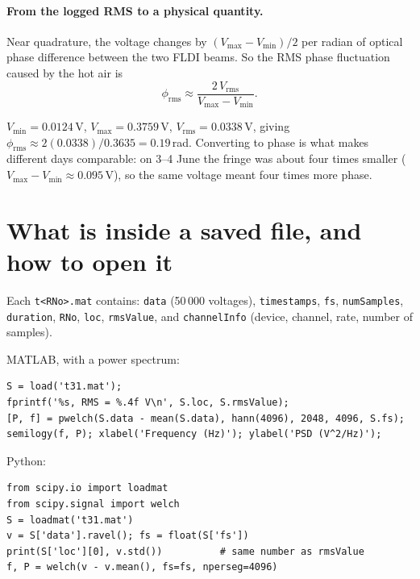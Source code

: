 \documentclass[11pt,a4paper]{article}
\newcommand{\code}[1]{\texttt{#1}}
\begin{document}
\paragraph{From the logged RMS to a physical quantity.} Near quadrature, the voltage changes by
$(V_{\max}-V_{\min})/2$ per radian of optical phase difference between the two FLDI beams. So the
RMS phase fluctuation caused by the hot air is
\[
\phi_{\mathrm{rms}} \approx \frac{2\,V_{\mathrm{rms}}}{V_{\max}-V_{\min}}.
\]
\begin{keypoint}
$V_{\min}=0.0124$\,V, $V_{\max}=0.3759$\,V, $V_{\mathrm{rms}}=0.0338$\,V, giving
$\phi_{\mathrm{rms}} \approx 2(0.0338)/0.3635 = 0.19$\,rad. Converting to phase is what makes
different days comparable: on 3--4 June the fringe was about four times smaller
($V_{\max}-V_{\min}\approx0.095$\,V), so the same voltage meant four times more phase.
\end{keypoint}

\section{What is inside a saved file, and how to open it}
Each \code{t<RNo>.mat} contains: \code{data} (50\,000 voltages), \code{timestamps}, \code{fs},
\code{numSamples}, \code{duration}, \code{RNo}, \code{loc}, \code{rmsValue}, and
\code{channelInfo} (device, channel, rate, number of samples).

\noindent MATLAB, with a power spectrum:
\begin{lstlisting}[style=m,numbers=none]
S = load('t31.mat');
fprintf('%s, RMS = %.4f V\n', S.loc, S.rmsValue);
[P, f] = pwelch(S.data - mean(S.data), hann(4096), 2048, 4096, S.fs);
semilogy(f, P); xlabel('Frequency (Hz)'); ylabel('PSD (V^2/Hz)');
\end{lstlisting}
Python:
\begin{lstlisting}[style=py]
from scipy.io import loadmat
from scipy.signal import welch
S = loadmat('t31.mat')
v = S['data'].ravel(); fs = float(S['fs'])
print(S['loc'][0], v.std())          # same number as rmsValue
f, P = welch(v - v.mean(), fs=fs, nperseg=4096)
\end{lstlisting}
\end{document}
